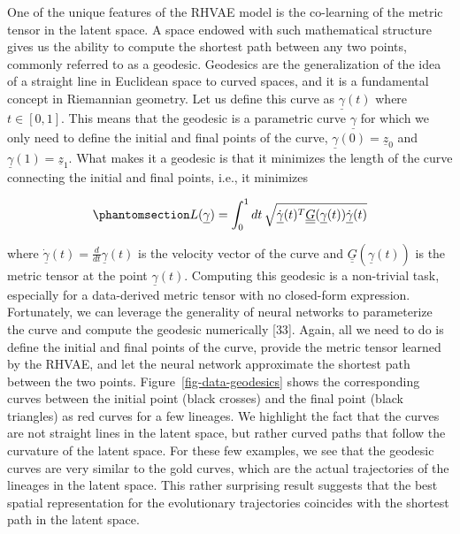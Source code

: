 \documentclass[
]{scrartcl}
\begin{document}
\begin{refsection}
One of the unique features of the RHVAE model is the co-learning of the
metric tensor in the latent space. A space endowed with such
mathematical structure gives us the ability to compute the shortest path
between any two points, commonly referred to as a geodesic. Geodesics
are the generalization of the idea of a straight line in Euclidean space
to curved spaces, and it is a fundamental concept in Riemannian
geometry. Let us define this curve as \(\underline{\gamma}(t)\) where
\(t \in [0, 1]\). This means that the geodesic is a parametric curve
\(\underline{\gamma}\) for which we only need to define the initial and
final points of the curve, \(\underline{\gamma}(0) = \underline{z}_0\)
and \(\underline{\gamma}(1) = \underline{z}_1\). What makes it a
geodesic is that it minimizes the length of the curve connecting the
initial and final points, i.e., it minimizes

\begin{equation}\phantomsection\label{eq-geodesic}{
L(\underline{\gamma}) = \int_0^1 
dt \,
\sqrt{
    \underline{\dot{\gamma}}(t)^T 
    \underline{\underline{G}}(\underline{\gamma}(t))
    \underline{\dot{\gamma}}(t)
}
}\end{equation}

where
\(\underline{\dot{\gamma}}(t) = \frac{d}{dt} \underline{\gamma}(t)\) is
the velocity vector of the curve and
\(\underline{\underline{G}}(\underline{\gamma}(t))\) is the metric
tensor at the point \(\underline{\gamma}(t)\). Computing this geodesic
is a non-trivial task, especially for a data-derived metric tensor with
no closed-form expression. Fortunately, we can leverage the generality
of neural networks to parameterize the curve and compute the geodesic
numerically {[}33{]}. Again, all we need to do is define the initial and
final points of the curve, provide the metric tensor learned by the
RHVAE, and let the neural network approximate the shortest path between
the two points. Figure~\ref{fig-data-geodesics} shows the corresponding
curves between the initial point (black crosses) and the final point
(black triangles) as red curves for a few lineages. We highlight the
fact that the curves are not straight lines in the latent space, but
rather curved paths that follow the curvature of the latent space. For
these few examples, we see that the geodesic curves are very similar to
the gold curves, which are the actual trajectories of the lineages in
the latent space. This rather surprising result suggests that the best
spatial representation for the evolutionary trajectories coincides with
the shortest path in the latent space.


\end{refsection}
\end{document}
